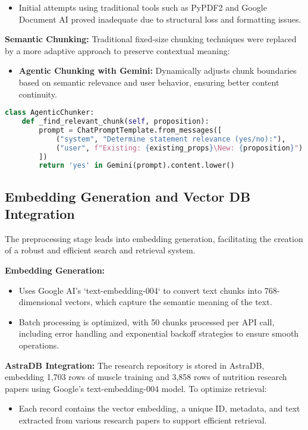 \documentclass[conference]{IEEEtran}
\begin{document}
\begin{itemize}
    \item Initial attempts using traditional tools such as PyPDF2 and Google Document AI proved inadequate due to structural loss and formatting issues.
\end{itemize}

\textbf{Semantic Chunking:}
Traditional fixed-size chunking techniques were replaced by a more adaptive approach to preserve contextual meaning:
\begin{itemize}
    \item \textbf{Agentic Chunking with Gemini:} Dynamically adjusts chunk boundaries based on semantic relevance and user behavior, ensuring better content continuity.
\end{itemize}

\begin{lstlisting}[language=Python]
class AgenticChunker:
    def _find_relevant_chunk(self, proposition):
        prompt = ChatPromptTemplate.from_messages([
            ("system", "Determine statement relevance (yes/no):"),
            ("user", f"Existing: {existing_props}\New: {proposition}")
        ])
        return 'yes' in Gemini(prompt).content.lower()
\end{lstlisting}

\subsection{Embedding Generation and Vector DB Integration}
The preprocessing stage leads into embedding generation, facilitating the creation of a robust and efficient search and retrieval system.

\textbf{Embedding Generation:}
\begin{itemize}
    \item Uses Google AI's `text-embedding-004` to convert text chunks into 768-dimensional vectors, which capture the semantic meaning of the text.
    \item Batch processing is optimized, with 50 chunks processed per API call, including error handling and exponential backoff strategies to ensure smooth operations.
\end{itemize}

\textbf{AstraDB Integration:}
The research repository is stored in AstraDB, embedding 1,703 rows of muscle training and 3,858 rows of nutrition research papers using Google's text-embedding-004 model. To optimize retrieval:
\begin{itemize}
    \item Each record contains the vector embedding, a unique ID, metadata, and text extracted from various research papers to support efficient retrieval.
\end{itemize}
\end{document}
